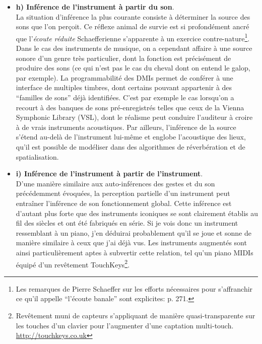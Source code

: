\begin{itemize}[noitemsep]
	\item \textbf{h) Inférence de l'instrument à partir du son}.\\
	\label{sec:gesture:inferences-soudure:inferences:instrument-sound}
	La situation d'inférence la plus courante consiste à déterminer la source des sons que l'on perçoit. Ce réflexe animal de survie est si profondément ancré que l'\textit{écoute réduite} Schaefferienne s'apparente à un exercice contre-nature\footnote{Les remarques de Pierre Schaeffer sur les efforts nécessaires pour s'affranchir ce qu'il appelle ``l'écoute banale'' sont explicites:  \cite{schaeffer_traite_1966} p. 271.}. Dans le cas des instruments de musique, on a cependant affaire à une source sonore d'un genre très particulier, dont la fonction est précisément de produire des sons (ce qui n'est pas le cas du cheval dont on entend le galop, par exemple). La programmabilité des \glspl{DMI} permet de conférer à une interface de multiples timbres, dont certains pouvant appartenir à des ``familles de sons'' déjà identifiées. C'est par exemple le cas lorsqu'on a recourt à des banques de sons pré-enregistrés telles que ceux de la Vienna Symphonic Library (VSL), dont le réalisme peut conduire l'auditeur à croire à de vrais instruments acoustiques. Par ailleurs, l'inférence de la source s'étend au-delà de l'instrument lui-même et englobe l'acoustique des lieux, qu'il est possible de modéliser dans des algorithmes de réverbération et de spatialisation.

	\item \textbf{i) Inférence de l'instrument à partir de l'instrument}.\\
	D'une manière similaire aux auto-inférences des gestes et du son précédemment évoquées, la perception partielle d'un instrument peut entraîner l'inférence de son fonctionnement global. Cette inférence est d'autant plus forte que des instruments iconiques se sont clairement établis au fil des siècles et ont été fabriqués en série. Si je vois donc un instrument ressemblant à un piano, j'en déduirai probablement qu'il se joue et sonne de manière similaire à ceux que j'ai déjà vus. Les instruments augmentés sont ainsi particulièrement aptes à subvertir cette relation, tel qu'un piano \glspl{MIDI} équipé d'un revêtement TouchKeys\footnote{Revêtement muni de capteurs s'appliquant de manière quasi-transparente sur les touches d'un clavier pour l'augmenter d'une captation multi-touch. \url{http://touchkeys.co.uk}}.


\end{itemize}
